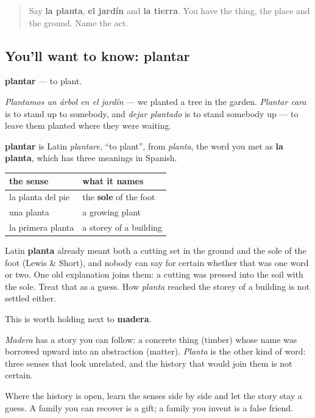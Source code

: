 \label{lesson:ES-C444-plantar}



\begin{quote}
Say \textbf{la planta}, \textbf{el jardín} and \textbf{la tierra}. You have the thing, the place and the ground. Name the act.
\end{quote}

\subsection*{You'll want to know: plantar}
\textbf{plantar} — to plant.

\emph{Plantamos un árbol en el jardín} — we planted a tree in the garden. \emph{Plantar cara} is to stand up to somebody, and \emph{dejar plantado} is to stand somebody up — to leave them planted where they were waiting.

\begin{cousinweb}
\textbf{plantar} is Latin \emph{plantare}, \textquotedblleft{}to plant\textquotedblright{}, from \emph{planta}, the word you met as \textbf{la planta}, which has three meanings in Spanish.

\noindent
\begin{tabularx}{\linewidth}{@{}>{\raggedright\arraybackslash}X>{\raggedright\arraybackslash}X@{}}
\toprule
\textbf{the sense} & \textbf{what it names} \\
\midrule
la planta del pie & the \textbf{sole} of the foot \\
una planta & a growing plant \\
la primera planta & a storey of a building \\
\bottomrule
\end{tabularx}

Latin \textbf{planta} already meant both a cutting set in the ground and the sole of the foot (Lewis \& Short), and nobody can say for certain whether that was one word or two. One old explanation joins them: a cutting was pressed into the soil with the sole. Treat that as a guess. How \emph{planta} reached the storey of a building is not settled either.
\end{cousinweb}

\begin{culture}
This is worth holding next to \textbf{madera}.

\emph{Madera} has a story you can follow: a concrete thing (timber) whose name was borrowed upward into an abstraction (matter). \emph{Planta} is the other kind of word: three senses that look unrelated, and the history that would join them is not certain.

Where the history is open, learn the senses side by side and let the story stay a guess. A family you can recover is a gift; a family you invent is a false friend.
\end{culture}

